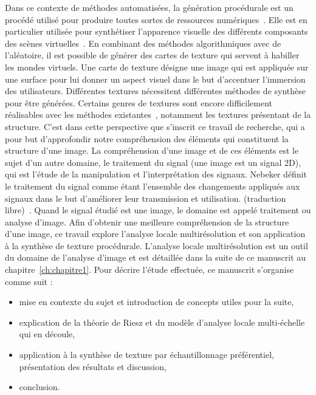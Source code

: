 Dans ce contexte de méthodes automatisées, la génération procédurale est un procédé utilisé pour produire toutes sortes de ressources numériques~\cite{smelik_survey_2014}. Elle est en particulier utilisée pour synthétiser l'apparence visuelle des différents composants des scènes virtuelles~\cite{alessio_procedural_2021}. En combinant des méthodes algorithmiques avec de l'aléatoire, il est possible de générer des cartes de texture qui servent à habiller les mondes virtuels. Une carte de texture désigne une image qui est appliquée sur une surface pour lui donner un aspect visuel dans le but d'accentuer l'immersion des utilisateurs. Différentes textures nécessitent différentes méthodes de synthèse pour être générées. Certains genres de textures sont encore difficilement réalisables avec les méthodes existantes~\cite{lutz_cyclostationary-gaussian_2021}, notamment les textures présentant de la structure. C'est dans cette perspective que s'inscrit ce travail de recherche, qui a pour but d'approfondir notre compréhension des éléments qui constituent la structure d'une image. La compréhension d'une image et de ces éléments est le sujet d'un autre domaine, le traitement du signal (une image est un signal 2D), qui est l'étude de la manipulation et l'interprétation des signaux. Nebeker définit le traitement du signal comme étant \og [...] l'ensemble des changements appliqués aux signaux dans le but d'améliorer leur transmission et utilisation. \fg (traduction libre)~\cite{nebeker_fifty_1998}. Quand le signal étudié est une image, le domaine est appelé traitement ou analyse d'image. Afin d'obtenir une meilleure compréhension de la structure d'une image, ce travail explore l'analyse locale multirésolution et son application à la synthèse de texture procédurale. L'analyse locale multirésolution est un outil du domaine de l'analyse d'image et est détaillée dans la suite de ce manuscrit au chapitre~\ref{ch:chapitre1}. Pour décrire l'étude effectuée, ce manuscrit s'organise comme suit :

\begin{itemize}
    \item mise en contexte du sujet et introduction de concepts utiles pour la suite,
    \item explication de la théorie de Riesz et du modèle d'analyse locale multi-échelle qui en découle,
    \item application à la synthèse de texture par échantillonnage préférentiel, présentation des résultats et discussion,
    \item conclusion.
\end{itemize}

